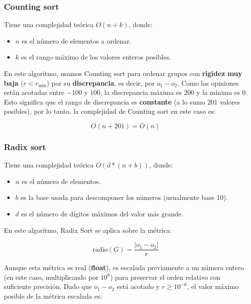 \subsubsection{Counting sort}

Tiene una complejidad teórica $O(n + k)$, donde:

\begin{itemize}
	\item $n$ es el número de elementos a ordenar.

	\item $k$ es el rango máximo de los valores enteros posibles.
\end{itemize}

En este algoritmo, usamos Counting sort para ordenar grupos con \textbf{rigidez muy baja} ($r < r_{ \min }$) por su \textbf{discrepancia}, es decir, por $o_1 - o_2$. Como las opiniones están acotadas entre $-100$ y $100$, la discrepancia máxima es $200$ y la mínima es $0$. Esto significa que el rango de discrepancia es \textbf{constante} (a lo sumo $201$ valores posibles), por lo tanto, la complejidad de Counting sort en este caso es:

\begin{equation}
	O(n + 201) = O(n)
\end{equation}

\subsubsection{Radix sort}

Tiene una complejidad teórica $O(d * (n + b))$, donde:

\begin{itemize}
	\item $n$ es el número de elementos.

	\item $b$ es la base usada para descomponer los números (usualmente base 10).

	\item $d$ es el número de dígitos máximos del valor más grande.
\end{itemize}

En este algoritmo, Radix Sort se aplica sobre la métrica:

\begin{equation}
	\text{radio}(G) = \frac{ |o_1 - o_2| }{ r }
\end{equation}

Aunque esta métrica es real (\textbf{float}), es escalada previamente a un número entero (en este caso, multiplicando por $10^6$) para preservar el orden relativo con suficiente precisión. Dado que $o_1 - o_2$ está acotado y $r \geq 10^{ -6 }$, el valor máximo posible de la métrica escalada es:

